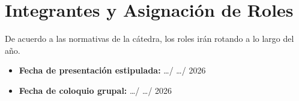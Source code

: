 \chapter{Integrantes y Asignación de Roles}
De acuerdo a las normativas de la cátedra, los roles irán rotando a lo largo del año.
\begin{table}[H]
    \centering
    \caption{Tabla de asignación de roles del grupo.}
\end{table}

\begin{itemize}
    \item \textbf{Fecha de presentación estipulada:} \dots / \dots / 2026
    \item \textbf{Fecha de coloquio grupal:} \dots / \dots / 2026
\end{itemize}
